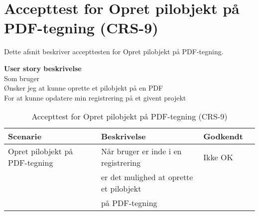 \section{Accepttest for Opret pilobjekt på PDF-tegning (CRS-9)}
Dette afsnit beskriver accepttesten for Opret pilobjekt på PDF-tegning.

\textbf{User story beskrivelse} \\
Som bruger \\
Ønsker jeg at kunne oprette et pilobjekt på en PDF \\
For at kunne opdatere min registrering på et givent projekt

\begin{table}[H]
	\centering
	\begin{tabular}{|ll|l|ll|} \hline
		\textbf{Scenarie} &  & \textbf{Beskrivelse}&  \textbf{Godkendt}&  \\ \hline
		Opret pilobjekt på PDF-tegning&  &  Når bruger er inde i en registrering &  Ikke OK&  \\
		& & er det mulighed at oprette et pilobjekt& & \\ 
		& & på PDF-tegning& & \\ \hline
	\end{tabular}
	\caption{Accepttest for Opret pilobjekt på PDF-tegning (CRS-9)}
	\label{AcceptPil}
\end{table}